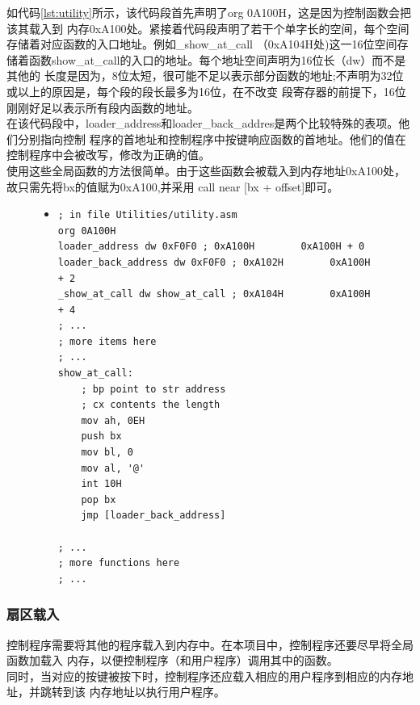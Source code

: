\documentclass[a4paper]{article}
\newcommand{\codev}[1]{\textsf{#1}}
\begin{document}
    如代码\ref{lst:utility}所示，该代码段首先声明了\codev{org 0A100H}，这是因为控制函数会把该其载入到
    内存0xA100处。紧接着代码段声明了若干个单字长的空间，每个空间存储着对应函数的入口地址。例如\codev{\_show\_at\_call}
    （0xA104H处)这一16位空间存储着函数\codev{show\_at\_call}的入口的地址。每个地址空间声明为16位长（dw）而不是其他的
    长度是因为，8位太短，很可能不足以表示部分函数的地址;不声明为32位或以上的原因是，每个段的段长最多为16位，在不改变
    段寄存器的前提下，16位刚刚好足以表示所有段内函数的地址。\\
    
    在该代码段中，\codev{loader\_address}和\codev{loader\_back\_addres}是两个比较特殊的表项。他们分别指向控制
    程序的首地址和控制程序中按键响应函数的首地址。他们的值在控制程序中会被改写，修改为正确的值。\\
    
    使用这些全局函数的方法很简单。由于这些函数会被载入到内存地址0xA100处，故只需先将bx的值赋为0xA100,并采用
    \codev{call near [bx + offset]}即可。
    \begin{figure}
    \begin{itemize}
    \item[] \begin{lstlisting}[language={[x86masm]Assembler}, label=lst:utility, caption=全局函数和其地址表的定义]
; in file Utilities/utility.asm
org 0A100H
loader_address dw 0xF0F0 ; 0xA100H        0xA100H + 0
loader_back_address dw 0xF0F0 ; 0xA102H        0xA100H + 2
_show_at_call dw show_at_call ; 0xA104H        0xA100H + 4
; ... 
; more items here
; ...
show_at_call:
    ; bp point to str address
    ; cx contents the length
    mov ah, 0EH
    push bx
    mov bl, 0
    mov al, '@'
    int 10H
    pop bx
    jmp [loader_back_address]

; ...
; more functions here
; ...
    \end{lstlisting}
    \end{itemize}
    \end{figure}

    \subsubsection{扇区载入}
    控制程序需要将其他的程序载入到内存中。在本项目中，控制程序还要尽早将全局函数加载入
    内存，以便控制程序（和用户程序）调用其中的函数。\\
    
    同时，当对应的按键被按下时，控制程序还应载入相应的用户程序到相应的内存地址，并跳转到该
    内存地址以执行用户程序。\\
    
\end{document}
